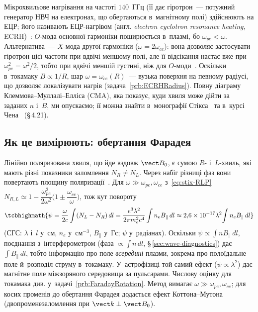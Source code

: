 Мікрохвильове нагрівання на частоті
$140$~ГГц (її дає гіротрон~--- потужний генератор НВЧ на електронах, що обертаються в~магнітному полі) здійснюють на ЕЦР; його називають ЕЦР-нагрівом (англ. \emph{electron cyclotron resonance heating}, ECRH)~\cite{prater2004heating,bornatici1983electron}: $O$-мода основної гармоніки поширюється в~плазмі, бо
$\omega_{pe}<\omega$. Альтернатива~--- $X$-мода другої гармоніки ($\omega=2\omega_{ce}$): вона
дозволяє застосувати гіротрон цієї частоти при вдвічі меншому полі, але
її відсікання настає вже при $\omega_{pe}^2=\omega^2/2$, тобто при вдвічі меншій густині, ніж для $O$-моди~\cite{chen2016introduction}. Оскільки в~токамаку $B\propto1/R$, шар $\omega=\omega_{ce}(R)$~--- вузька
поверхня на певному радіусі, що дозволяє локалізувати нагрів (задача~\ref{prb:ECRHRadius}). Повну
діаграму Клеммова--Муллалі--Елліса (CMA), яка показує, куди хвиля може дійти за заданих $n$ і~$B$, ми
опускаємо; її можна знайти в~монографії Стікса~\cite{stix1992waves} та в~курсі Чена~\cite{chen2016introduction} (§\,4.21).

\subsection*{Як це вимірюють: обертання Фарадея}\label{sec:faraday-diagnostics}
Лінійно поляризована хвиля, що йде вздовж $\vect B_0$, є сумою $R$- і~$L$-хвиль, які мають різні
показники заломлення $N_R\neq N_L$. Через набіг різниці фаз вони повертають площину поляризації~\cite{bittencourt2004fundamentals}.
Для $\omega\gg\omega_{pe},\omega_{ce}$ з~\eqref{eq:stix-RLP}
$N_{R,L}\simeq1-\dfrac{\omega_{pe}^2}{2\omega^2}\bigl(1\pm\dfrac{\omega_{ce}}\omega\bigr)$, тож кут повороту
\begin{equation}\label{eq:faraday-rotation}
	\tcbhighmath{\psi=\frac\omega{2c}\int(N_L-N_R)\,dl=\frac{e^3\lambda^2}{2\pi m_e^2c^4}\int n_eB_\parallel\,dl
	\approx2{,}6\times10^{-17}\lambda^2\!\int n_eB_\parallel\,dl}
\end{equation}
(СГС: $\lambda$ і~$l$ у~см, $n_e$ у~см$^{-3}$, $B_\parallel$ у~Гс; $\psi$ у~радіанах). Оскільки $\psi\propto\int nB_\parallel\,dl$,
поєднання з~інтерферометром (фаза $\propto\int n\,dl$, §\,\ref{sec:wave-diagnostics}) дає
$\int B_\parallel\,dl$, тобто інформацію про поле \emph{всередині} плазми, зокрема про полоїдальне поле й~розподіл
струму в~токамаку. У~астрофізиці той самий ефект ($\psi\propto\lambda^2$) дає магнітне поле міжзоряного
середовища за пульсарами. Числову оцінку для токамака див. у~задачі~\ref{prb:FaradayRotation}.
Метод вимагає $\omega\gg\omega_{pe},\omega_{ce}$; для косих променів до обертання Фарадея додається ефект Коттона--Мутона (двопроменезаломлення при $\vect k\perp\vect B_0$).



